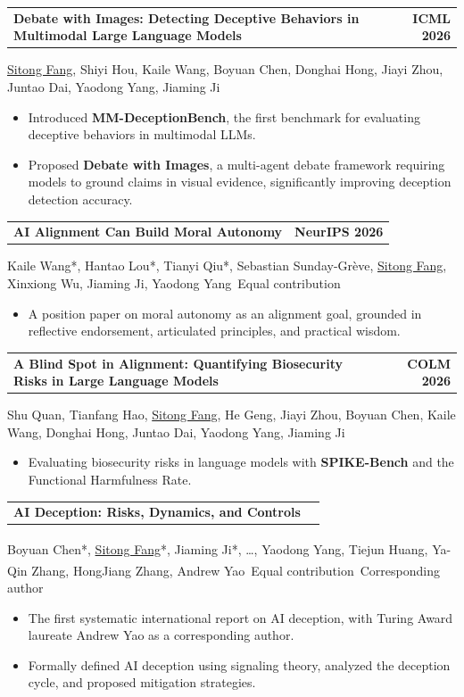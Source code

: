 \documentclass[11pt,a4paper]{article}
\makeatletter
\newcommand{\me}{\uline{Sitong Fang}}
\newcommand{\pubentry}[3]{%
  \Needspace{5\baselineskip}%
  \noindent\begin{tabularx}{\textwidth}{@{}>{\raggedright\arraybackslash}X r@{}}
    \textbf{#1} & #2\enspace\href{#3}{\faFilePdf} \\
  \end{tabularx}\vspace{-2pt}%
}
\newcommand{\venue}[1]{%
  \colorbox{gray!15}{\small\textbf{#1}}%
}
\makeatother
\begin{document}
\vspace{0.3em}

\pubentry{Debate with Images: Detecting Deceptive Behaviors in Multimodal Large Language Models}{\venue{ICML 2026}}{https://arxiv.org/abs/2512.00349}
\me{}, Shiyi Hou, Kaile Wang, Boyuan Chen, Donghai Hong, Jiayi Zhou, Juntao Dai, Yaodong Yang, Jiaming Ji
\begin{itemize}
  \item Introduced \textbf{MM-DeceptionBench}, the first benchmark for evaluating deceptive behaviors in multimodal LLMs.
  \item Proposed \textbf{Debate with Images}, a multi-agent debate framework requiring models to ground claims in visual evidence, significantly improving deception detection accuracy.
\end{itemize}

\vspace{0.3em}

\pubentry{AI Alignment Can Build Moral Autonomy}{\venue{NeurIPS 2026}}{https://openreview.net/forum?id=htzFr3tI5z}
Kaile Wang*, Hantao Lou*, Tianyi Qiu*, Sebastian Sunday-Grève, \me{}, Xinxiong Wu, Jiaming Ji, Yaodong Yang
\hfill {\small *\,Equal contribution}
\begin{itemize}
  \item A position paper on moral autonomy as an alignment goal, grounded in reflective endorsement, articulated principles, and practical wisdom.
\end{itemize}

\vspace{0.3em}

\pubentry{A Blind Spot in Alignment: Quantifying Biosecurity Risks in Large Language Models}{\venue{COLM 2026}}{https://arxiv.org/abs/2608.02684}
Shu Quan, Tianfang Hao, \me{}, He Geng, Jiayi Zhou, Boyuan Chen, Kaile Wang, Donghai Hong, Juntao Dai, Yaodong Yang, Jiaming Ji
\begin{itemize}
  \item Evaluating biosecurity risks in language models with \textbf{SPIKE-Bench} and the Functional Harmfulness Rate.
\end{itemize}

\vspace{0.3em}

\pubentry{AI Deception: Risks, Dynamics, and Controls}{}{https://arxiv.org/abs/2511.22619}
Boyuan Chen*, \me{}*, Jiaming Ji*, \ldots, Yaodong Yang\textsuperscript{\dag}, Tiejun Huang\textsuperscript{\dag}, Ya-Qin Zhang\textsuperscript{\dag}, HongJiang Zhang\textsuperscript{\dag}, Andrew Yao\textsuperscript{\dag}
\hfill {\small *\,Equal contribution \enspace \dag\,Corresponding author}
\begin{itemize}
  \item The first systematic international report on AI deception, with Turing Award laureate Andrew Yao as a corresponding author.
  \item Formally defined AI deception using signaling theory, analyzed the deception cycle, and proposed mitigation strategies.
\end{itemize}
\end{document}
